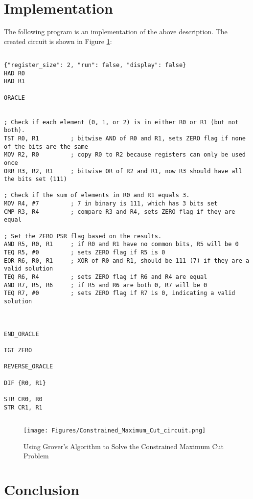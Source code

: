 \section{Implementation}

The following program is an implementation of the above description. The created circuit is shown in Figure \ref{fig:Constrained_Maximum_Cut}:

\begin{lstlisting}

{"register_size": 2, "run": false, "display": false}
HAD R0
HAD R1

ORACLE


; Check if each element (0, 1, or 2) is in either R0 or R1 (but not both).
TST R0, R1         ; bitwise AND of R0 and R1, sets ZERO flag if none of the bits are the same
MOV R2, R0         ; copy R0 to R2 because registers can only be used once
ORR R3, R2, R1     ; bitwise OR of R2 and R1, now R3 should have all the bits set (111)

; Check if the sum of elements in R0 and R1 equals 3.
MOV R4, #7         ; 7 in binary is 111, which has 3 bits set
CMP R3, R4         ; compare R3 and R4, sets ZERO flag if they are equal

; Set the ZERO PSR flag based on the results.
AND R5, R0, R1     ; if R0 and R1 have no common bits, R5 will be 0
TEQ R5, #0         ; sets ZERO flag if R5 is 0
EOR R6, R0, R1     ; XOR of R0 and R1, should be 111 (7) if they are a valid solution
TEQ R6, R4         ; sets ZERO flag if R6 and R4 are equal
AND R7, R5, R6     ; if R5 and R6 are both 0, R7 will be 0
TEQ R7, #0         ; sets ZERO flag if R7 is 0, indicating a valid solution



END_ORACLE

TGT ZERO

REVERSE_ORACLE

DIF {R0, R1}

STR CR0, R0
STR CR1, R1


\end{lstlisting}

\begin{figure}[htp]
    \centering
    \texttt{[image: Figures/Constrained\_Maximum\_Cut\_circuit.png]}
    \caption{Using Grover's Algorithm to Solve the Constrained Maximum Cut Problem}
    \label{fig:Constrained_Maximum_Cut}
\end{figure}

\section{Conclusion}\label{sec:conclusion}

